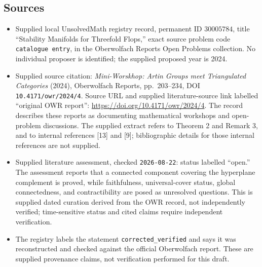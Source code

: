 \documentclass[11pt]{article}
\begin{document}
\subsection{Sources}
\begin{itemize}
\item Supplied local UnsolvedMath registry record, permanent ID \(30005784\), title ``Stability Manifolds for Threefold Flops,'' exact source problem code \texttt{catalogue entry}, in the Oberwolfach Reports Open Problems collection. No individual proposer is identified; the supplied proposed year is 2024.
\item Supplied source citation: \emph{Mini-Worskhop: Artin Groups meet Triangulated Categories} (2024), Oberwolfach Reports, pp.~203--234, DOI \texttt{10.4171/owr/2024/4}. Source URL and supplied literature-source link labelled ``original OWR report'': \url{https://doi.org/10.4171/owr/2024/4}. The record describes these reports as documenting mathematical workshops and open-problem discussions. The supplied extract refers to Theorem 2 and Remark 3, and to internal references [13] and [9]; bibliographic details for those internal references are not supplied.
\item Supplied literature assessment, checked \texttt{2026-08-22}: status labelled ``open.'' The assessment reports that a connected component covering the hyperplane complement is proved, while faithfulness, universal-cover status, global connectedness, and contractibility are posed as unresolved questions. This is supplied dated curation derived from the OWR record, not independently verified; time-sensitive status and cited claims require independent verification.
\item The registry labels the statement \texttt{corrected\_verified} and says it was reconstructed and checked against the official Oberwolfach report. These are supplied provenance claims, not verification performed for this draft.
\end{itemize}
\end{document}
